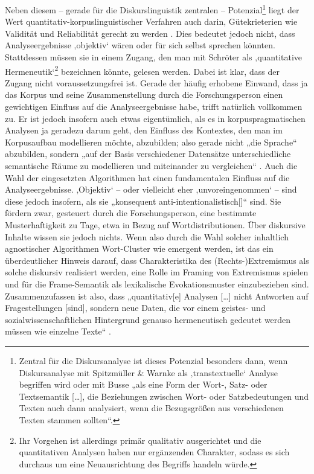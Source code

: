 Neben diesem -- gerade für die Diskurslinguistik zentralen -- Potenzial\footnote{Zentral für die Diskursanalyse ist dieses Potenzial besonders dann, wenn Diskursanalyse mit Spitzmüller \& Warnke \autocite*{spitzmullerDiskurslinguistikEinfuhrungTheorien2011} als ‚transtextuelle` Analyse begriffen wird oder mit Busse \autocite*[24]{busseDiskursSpracheGesellschaftliches2013} „als eine Form der Wort-, Satz- oder Textsemantik {[}\ldots{]}, die Beziehungen zwischen Wort- oder Satzbedeutungen und Texten auch dann analysiert, wenn die Bezugsgrößen aus verschiedenen Texten stammen sollten``.} liegt der Wert quantitativ-korpuslinguistischer Verfahren auch darin, Gütekrieterien wie Validität und Reliabilität gerecht zu werden \autocite{scharlothWuchernRhizomeLinguistische2013}. Dies bedeutet jedoch nicht, dass Analyseergebnisse ‚objektiv` wären oder für sich selbst sprechen könnten. Stattdessen müssen sie in einem Zugang, den man mit Schröter \autocite*[363-364]{schroeterWennMenschenAuseinandergehn2012} als ‚quantitative Hermeneutik`\footnote{Ihr Vorgehen ist allerdings primär qualitativ ausgerichtet und die quantitativen Analysen haben nur ergänzenden Charakter, sodass es sich durchaus um eine Neuausrichtung des Begriffs handeln würde.} bezeichnen könnte, gelesen werden. Dabei ist klar, dass der Zugang nicht voraussetzungsfrei ist. Gerade der häufig erhobene Einwand, dass ja das Korpus und seine Zusammenstellung durch die Forschungsperson einen gewichtigen Einfluss auf die Analyseergebnisse habe, trifft natürlich vollkommen zu. Er ist jedoch insofern auch etwas eigentümlich, als es in korpuspragmatischen Analysen ja geradezu darum geht, den Einfluss des Kontextes, den man im Korpusaufbau modellieren möchte, abzubilden; also gerade nicht „die Sprache`` abzubilden, sondern „auf der Basis verschiedener Datensätze unterschiedliche semantische Räume zu modellieren und miteinander zu vergleichen`` \autocite[218]{knuchelMachineLearningUnd2023}. Auch die Wahl der eingesetzten Algorithmen hat einen fundamentalen Einfluss auf die Analyseergebnisse. ‚Objektiv` -- oder vielleicht eher ‚unvoreingenommen` -- sind diese jedoch insofern, als sie „konsequent anti-intentionalistisch{[}{]}`` \autocite[724]{wilkSturmNieWar2021} sind. Sie fördern zwar, gesteuert durch die Forschungsperson, eine bestimmte Musterhaftigkeit zu Tage, etwa in Bezug auf Wortdistributionen. Über diskursive Inhalte wissen sie jedoch nichts. Wenn also durch die Wahl solcher inhaltlich agnostischer Algorithmen Wort-Cluster wie  emergent werden, ist das ein überdeutlicher Hinweis darauf, dass Charakteristika des (Rechts\mbox{-})Extremismus als solche diskursiv realisiert werden, eine Rolle im Framing von Extremismus spielen und für die Frame-Semantik als lexikalische Evokationsmuster einzubeziehen sind. Zusammenzufassen ist also, dass „quantitativ{[}e{]} Analysen {[}\ldots{]} nicht Antworten auf Fragestellungen {[}sind{]}, sondern neue Daten, die vor einem geistes- und sozialwissenschaftlichen Hintergrund genauso hermeneutisch gedeutet werden müssen wie einzelne Texte`` \autocite[25]{bubenhoferWennLinguistikKorpuslinguistik2018}.

